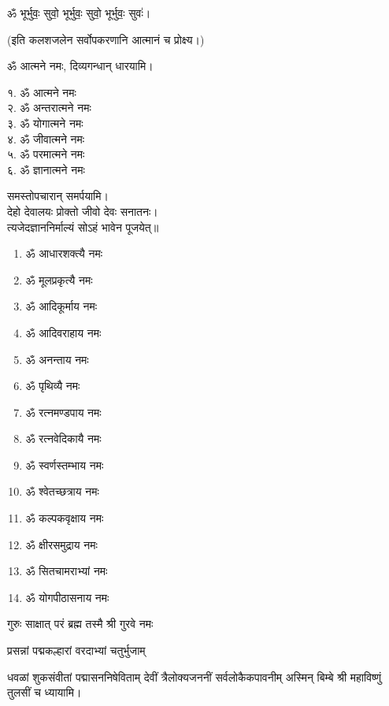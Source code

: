 \centerline{ॐ भूर्भुवः॒ सुवो॒ भूर्भुवः॒ सुवो॒ भूर्भुवः॒ सुवः॑।}

(इति कलशजलेन सर्वोपकरणानि आत्मानं च प्रोक्ष्य।)

ॐ आत्मने नमः, दिव्यगन्धान् धारयामि।
\begin{multicols}{2}
१. ॐ आत्मने नमः\\
२. ॐ अन्तरात्मने नमः\\
३. ॐ योगात्मने नमः\\
४. ॐ जीवात्मने नमः\\
५. ॐ परमात्मने नमः\\
६. ॐ ज्ञानात्मने नमः
\end{multicols}
समस्तोपचारान् समर्पयामि।\\

देहो देवालयः प्रोक्तो जीवो देवः सनातनः।\\
त्यजेदज्ञाननिर्माल्यं सोऽहं भावेन पूजयेत्॥\\

\begin{multicols}{2}
\begin{enumerate}
\item ॐ आधारशक्त्यै नमः
\item ॐ मूलप्रकृत्यै नमः
\item ॐ आदिकूर्माय नमः
\item ॐ आदिवराहाय नमः
\item ॐ अनन्ताय नमः
\item ॐ पृथिव्यै नमः
\item ॐ रत्नमण्डपाय नमः
\item ॐ रत्नवेदिकायै नमः
\item ॐ स्वर्णस्तम्भाय नमः
\item ॐ श्वेतच्छत्राय नमः
\item ॐ कल्पकवृक्षाय नमः
\item ॐ क्षीरसमुद्राय नमः
\item ॐ सितचामराभ्यां नमः
\item ॐ योगपीठासनाय नमः
\end{enumerate}
\end{multicols}

{गुरुः साक्षात् परं ब्रह्म तस्मै श्री गुरवे नमः}

\centering

{प्रसन्नां पद्मकल्हारां वरदाभ्यां चतुर्भुजाम्}

{धवळां शुकसंवीतां पद्मासननिषेविताम्}
{देवीं त्रैलोक्यजननीं सर्वलोकैकपावनीम्}
अस्मिन् बिम्बे श्री महाविष्णुं तुलसीं च ध्यायामि।

